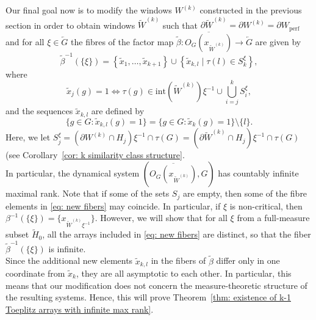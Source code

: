 \documentclass[titlepage,reqno,10pt]{amsart}
\theoremstyle{definition}
\newcommand{\ol}[1]{\overline{#1}}
\begin{document}
Our final goal now is to modify the windows $W^{(k)}$ constructed in the previous section in order to obtain windows $\widetilde{W}^{(k)}$ such that $\partial \widetilde{W}^{(k)} = \partial W^{(k)} = \partial W_{\mathrm{perf}}$ and for all $\xi \in\overleftarrow{G}$ the fibres of the factor map $\widetilde\beta:\overline{O_G(x_{\widetilde{W}^{(k)}})}\to\overleftarrow{G}$ are given by 
\begin{equation} \label{eq: new fibers}
\widetilde\beta^{-1}(\{\xi\}) = \left\{\widetilde{x}_1,\ldots,\widetilde{x}_{k+1}\right\} \cup \left\{\widetilde{x}_{k,l} \mid \tau(l) \in S_k^\xi\right\} ,
\end{equation}
where 
\begin{equation}\label{eq:tilde-x}
   \widetilde{x}_j(g)=1 \iff \tau(g) \in \mathrm{int}(\widetilde{W}^{(k)})\xi^{-1} \cup \bigcup_{i=j}^k S_i^\xi, 
\end{equation}
and the sequences $\widetilde{x}_{k,l}$ are defined by 
$$
\{g\in G: \widetilde{x}_{k,l}(g)=1\}=\{g\in G: \widetilde{x}_k(g)=1\}\setminus\{l\}.
$$
Here, we let $S_j^\xi = (\partial W^{(k)}\cap H_j)\xi^{-1}\cap \tau(G) = (\partial \widetilde{W}^{(k)}\cap H_j)\xi^{-1}\cap \tau(G)$ (see Corollary~\ref{cor: k similarity class structure}.\\
In particular, the dynamical system $(\ol{O_G(x_{\widetilde{W}^{(k)}})},G)$ has countably infinite maximal rank.
Note that if some of the sets $S_j$ are empty, then some of the fibre elements in \eqref{eq: new fibers} may coincide. In particular, if $\xi$ is non-critical, then $\beta^{-1}(\{\xi\}) = \{x_{\widetilde{W}^{(k)}\xi^{-1}}\}$.
However, we will show that for all $\xi$ from a full-measure subset $\widetilde{H}_0$, all the arrays included in \eqref{eq: new fibers} are distinct, so that the fiber $\widetilde{\beta}^{-1}(\{\xi\})$ is infinite.\\
Since the additional new elements $\widetilde{x}_{k,l}$ in the fibers of $\widetilde\beta$ differ only in one coordinate from $\widetilde{x}_k$, they are all asymptotic to each other. In particular, this means that our modification does not concern the measure-theoretic structure of the resulting systems. 
Hence, this will prove Theorem~\ref{thm: existence of k-1 Toeplitz arrays with infinite max rank}. 
\end{document}
